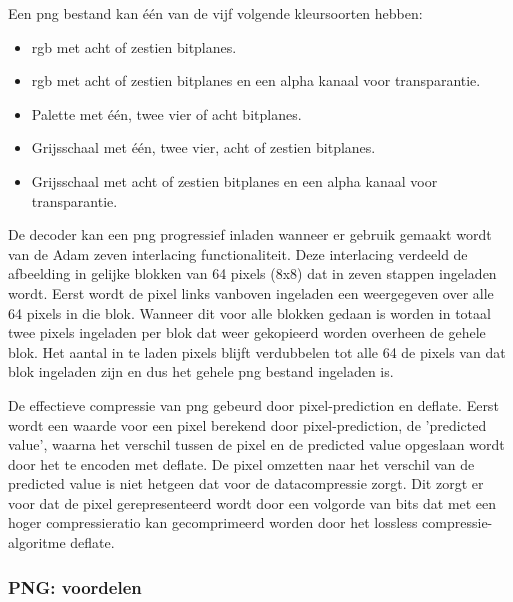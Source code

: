 Een \gls{png} bestand kan één van de vijf volgende kleursoorten hebben:

\begin{itemize}
	\item \Gls{rgb} met acht of zestien \glspl{bitplane}.
	
	\item \Gls{rgb} met acht of zestien \glspl{bitplane} en een alpha kanaal voor transparantie.
	
	\item Palette met één, twee vier of acht \glspl{bitplane}.
	
	\item Grijsschaal met één, twee vier, acht of zestien \glspl{bitplane}.
	
	\item Grijsschaal met acht of zestien \glspl{bitplane} en een alpha kanaal voor transparantie.
	
\end{itemize}
 

De \gls{decoder} kan een \gls{png} progressief inladen wanneer er gebruik gemaakt wordt van de Adam zeven interlacing functionaliteit. Deze interlacing verdeeld de afbeelding in gelijke blokken van 64 pixels (8x8) dat in zeven stappen ingeladen wordt. Eerst wordt de pixel links vanboven ingeladen een weergegeven over alle 64 pixels in die blok. Wanneer dit voor alle blokken gedaan is worden in totaal twee pixels ingeladen per blok dat weer gekopieerd worden overheen de gehele blok. Het aantal in te laden pixels blijft verdubbelen tot alle 64 de pixels van dat blok ingeladen zijn en dus het gehele \gls{png} bestand ingeladen is.

De effectieve compressie van \gls{png} gebeurd door \gls{pixel-prediction} en \gls{deflate}. Eerst wordt een waarde voor een pixel berekend door \gls{pixel-prediction}, de 'predicted value', waarna het verschil tussen de pixel en de predicted value opgeslaan wordt door het te encoden met \gls{deflate}. De pixel omzetten naar het verschil van de predicted value is niet hetgeen dat voor de \gls{datacompressie} zorgt. Dit zorgt er voor dat de pixel gerepresenteerd wordt door een volgorde van \glspl{bit} dat met een hoger compressieratio kan gecomprimeerd worden door het \gls{lossless} \gls{compressie-algoritme} \gls{deflate}.

\subsubsection{PNG: voordelen}
\label{sec:afbeeldingscompressie-png-voordelen}

